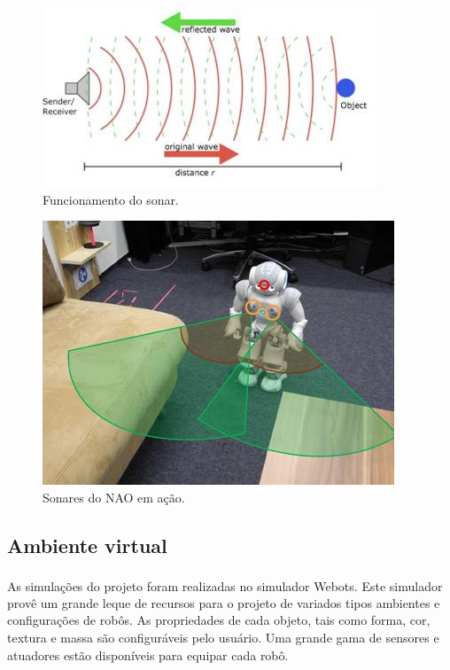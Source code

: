 \documentclass[twoside,conference,a4paper]{IEEEtran}
\begin{document}
\begin{figure}[ht]
\centering
\includegraphics[width=1\hsize]{figuras/nao-sonar2.jpg}
\caption{Funcionamento do sonar.}
\label{fig:fig4}
\end{figure}

\begin{figure}[ht]
\centering
\includegraphics[width=1\hsize]{figuras/nao-sonar3.jpg}
\caption{Sonares do NAO em ação.}
\label{fig:fig5}
\end{figure}

\subsection{Ambiente virtual}
As simulações do projeto foram realizadas no simulador Webots\textsuperscript{\textregistered}. Este simulador provê um grande leque de recursos para o projeto de variados tipos ambientes e configurações de robôs. As propriedades de cada objeto, tais como forma, cor, textura e massa são configuráveis pelo usuário. Uma grande gama de sensores e atuadores estão disponíveis para equipar cada robô.
\end{document}
